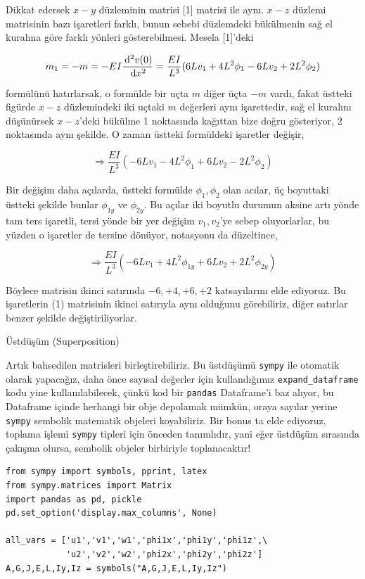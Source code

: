 \documentclass[12pt,fleqn]{article}\usepackage{../../common}
\begin{document}
Dikkat edersek $x-y$ düzleminin matrisi [1] matrisi ile aynı. $x-z$ düzlemi
matrisinin bazı işaretleri farklı, bunun sebebi düzlemdeki bükülmenin sağ el
kuralına göre farklı yönleri gösterebilmesi. Mesela [1]'deki 

$$
m_1 = -m = -EI \frac{\,\mathrm{d}^2 v(0)}{\,\mathrm{d} x^2} =
\frac{EI}{L^3} ( 6L v_1 + 4L^2 \phi_1 - 6L v_2 + 2 L^2 \phi_2 )
$$

formülünü hatırlarsak, o formülde bir uçta $m$ diğer üçta $-m$ vardı, fakat
üstteki figürde $x-z$ düzlemindeki iki uçtaki $m$ değerleri aynı işarettedir,
sağ el kuralını düşünürsek $x-z$'deki bükülme 1 noktasında kağıttan bize doğru
gösteriyor, 2 noktasında aynı şekilde. O zaman üstteki formüldeki işaretler
değişir,

$$
\Rightarrow \frac{EI}{L^3} ( -6L v_1 - 4L^2 \phi_1 + 6L v_2 - 2 L^2 \phi_2 )
$$

Bir değişim daha açılarda, üstteki formülde $\phi_1,\phi_2$ olan acılar,
üç boyuttaki üstteki şekilde bunlar $\phi_{1y}$ ve $\phi_{2y}$. Bu açılar
iki boyutlu durumun aksine artı yönde tam ters işaretli, tersi yönde bir
yer değişim $v_1,v_2$'ye sebep oluyorlarlar, bu yüzden o işaretler de
tersine dönüyor, notasyonu da düzeltince,

$$
\Rightarrow \frac{EI}{L^3} ( -6L v_1 + 4L^2 \phi_{1y} + 6L v_2 + 2 L^2 \phi_{2y} )
$$

Böylece matrisin ikinci satırında $-6,+4,+6,+2$ katsayılarını elde ediyoruz.
Bu işaretlerin (1) matrisinin ikinci satırıyla aynı olduğunu görebiliriz,
diğer satırlar benzer şekilde değiştiriliyorlar.

Üstdüşüm (Superposition)

Artık bahsedilen matrisleri birleştirebiliriz. Bu üstdüşümü \verb!sympy!  ile
otomatik olarak yapacağız, daha önce sayısal değerler için kullandığımız
\verb!expand_dataframe! kodu yine kullanılabilecek, çünkü kod bir \verb!pandas!
Dataframe'i baz alıyor, bu Dataframe içinde herhangi bir obje depolamak mümkün,
oraya sayılar yerine \verb!sympy! sembolik matematik objeleri koyabiliriz. Bir
bonus ta elde ediyoruz, toplama işlemi \verb!sympy! tipleri için önceden
tanımlıdır, yani eğer üstdüşüm sırasında çakışma olursa, sembolik objeler
birbiriyle toplanacaktır!

\begin{verbatim}
from sympy import symbols, pprint, latex
from sympy.matrices import Matrix
import pandas as pd, pickle
pd.set_option('display.max_columns', None)

all_vars = ['u1','v1','w1','phi1x','phi1y','phi1z',\
            'u2','v2','w2','phi2x','phi2y','phi2z']
A,G,J,E,L,Iy,Iz = symbols("A,G,J,E,L,Iy,Iz")
\end{verbatim}
\end{document}
